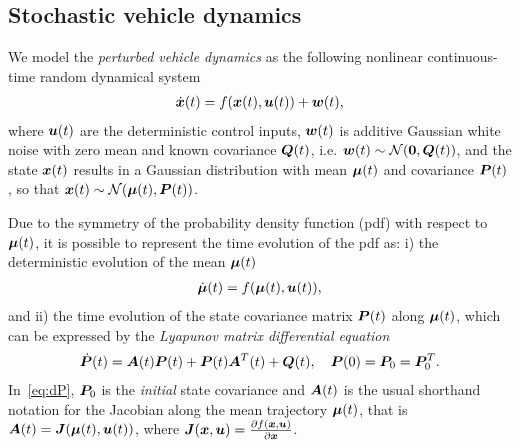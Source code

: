 \subsection{Stochastic vehicle dynamics}
\label{sec:stochastic_vehicle_dynamics}

We model the \emph{perturbed vehicle dynamics} as the following nonlinear continuous-time random dynamical system
\begin{align}
\dot{\boldsymbol{x}}(t) = f(\boldsymbol{x}(t), \boldsymbol{u}(t)) + \boldsymbol{w}(t),
\end{align}
where $\boldsymbol{u}(t)$ are the deterministic control inputs, $\boldsymbol{w}(t)$ is additive Gaussian white noise with zero mean and known covariance $\boldsymbol{Q}(t)$, i.e. $\boldsymbol{w}(t) \sim \mathcal{N}(\boldsymbol{0}, \boldsymbol{Q}(t))$, and the state $\boldsymbol{x}(t)$ results in a Gaussian distribution with mean $\boldsymbol{\mu}(t)$ and covariance $\boldsymbol{P}(t)$, so that $\boldsymbol{x}(t) \sim \mathcal{N}(\boldsymbol{\mu}(t), \boldsymbol{P}(t))$.

Due to the symmetry of the probability density function (pdf) with respect to $\boldsymbol{\mu}(t)$, it is possible to represent the time evolution of the pdf as: i) the deterministic evolution of the mean $\boldsymbol{\mu}(t)$
\begin{align}\label{eq:meandynamics}
\dbmu(t) = f(\bmu(t), \bu(t)),
\end{align}
and ii) the time evolution of the state covariance matrix $\boldsymbol{P}(t)$ along $\boldsymbol{\mu}(t)$, which can be expressed by the \emph{Lyapunov matrix differential equation}
\begin{align}\label{eq:dP}
\dbP(t) = \bA(t) \bP(t) + \bP(t) \bA^T(t) + \bQ(t),\quad \bP(0) = \bP_0 = \bP_0^T.
\end{align}
In~\eqref{eq:dP}, $\boldsymbol{P}_0$ is the \emph{initial} state covariance and $\boldsymbol{A}(t)$ is the usual shorthand notation for the Jacobian along the mean trajectory $\boldsymbol{\mu}(t)$, that is $\boldsymbol{A}(t)=\boldsymbol{J}(\boldsymbol{\mu}(t),\boldsymbol{u}(t))$, where $\boldsymbol{J}(\boldsymbol{x}, \boldsymbol{u}) = \frac{\partial f(\boldsymbol{x}, \boldsymbol{u})}{\partial \boldsymbol{x}}$.

